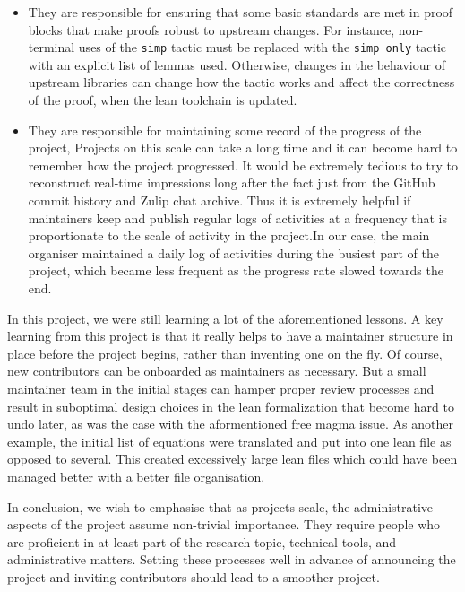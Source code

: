 \begin{itemize}
    \item They are responsible for ensuring that some basic standards are met in proof blocks that make proofs robust to upstream changes. For instance, non-terminal uses of the \texttt{simp} tactic must be replaced with the \texttt{simp only} tactic with an explicit list of lemmas used. Otherwise, changes in the behaviour of upstream libraries can change how the tactic works and affect the correctness of the proof, when the lean toolchain is updated.
    \item They are responsible for maintaining some record of the progress of the project, Projects on this scale can take a long time and it can become hard to remember how the project progressed. It would be extremely tedious to try to reconstruct real-time impressions long after the fact just from the GitHub commit history and Zulip chat archive. Thus it is extremely helpful if maintainers keep and publish regular logs of activities at a frequency that is proportionate to the scale of activity in the project.In our case, the main organiser maintained a daily log of activities during the busiest part of the project, which became less frequent as the progress rate slowed towards the end.
\end{itemize}

In this project, we were still learning a lot of the aforementioned lessons. A key learning from this project is that it really helps to have a maintainer structure in place before the project begins, rather than inventing one on the fly. Of course, new contributors can be onboarded as maintainers as necessary. But a small maintainer team in the initial stages can hamper proper review processes and result in suboptimal design choices in the lean formalization that become hard to undo later, as was the case with the aformentioned free magma issue. As another example, the initial list of equations were translated and put into one lean file as opposed to several. This created excessively large lean files which could have been managed better with a better file organisation.

In conclusion, we wish to emphasise that as projects scale, the administrative aspects of the project assume non-trivial importance. They require people who are proficient in at least part of the research topic, technical tools, and administrative matters. Setting these processes well in advance of announcing the project and inviting contributors should lead to a smoother project.

